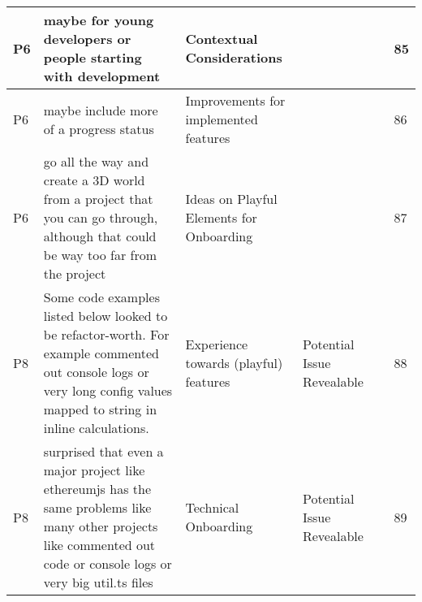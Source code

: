 \begin{appendices}
\begin{landscape}
\begin{longtable}{|p{0.8cm}|p{7cm}|p{3cm}|p{3cm}|p{5.5cm}|p{0.5cm}|}
      P6                   & maybe for young developers or people starting with development                                                                                                                                                                                                              & Contextual Considerations                &                                    &                                                                                                                                                    & 85           \\ \hline
      P6                   & maybe include more of a progress status                                                                                                                                                                                                                                     & Improvements for implemented features    &                                    &                                                                                                                                                    & 86           \\ \hline
      P6                   & go all the way and create a 3D world from a project that you can go through, although that could be way too far from the project                                                                                                                                            & Ideas on Playful Elements for Onboarding &                                    &                                                                                                                                                    & 87           \\ \hline
      P8                   & Some code examples listed below looked to be refactor-worth. For example commented out console logs or very long config values mapped to string in inline calculations.                                                                                                     & Experience towards (playful) features    & Potential Issue Revealable         &                                                                                                                                                    & 88           \\ \hline
      P8                   & surprised that even a major project like ethereumjs has the same problems like many other projects like commented out code or console logs or very big util.ts files                                                                                                        & Technical Onboarding                     & Potential Issue Revealable         &                                                                                                                                                    & 89           \\ \hline

\end{longtable}
\end{landscape}
\end{appendices}
